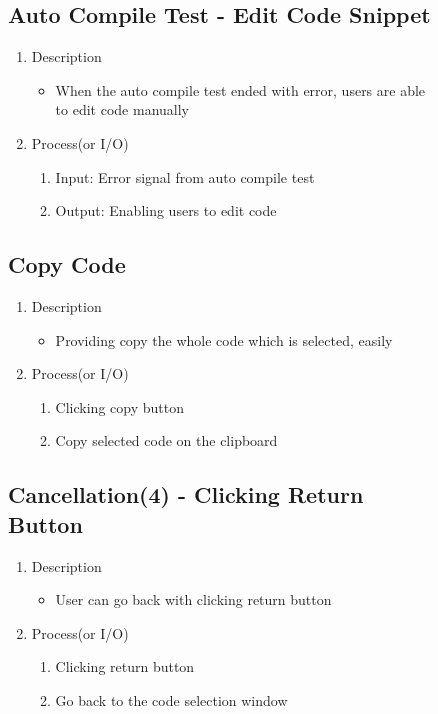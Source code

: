 \documentclass[conference]{IEEEtran}
\begin{document}
\begin{itemize}
\begin{itemize}
\begin{itemize}
\begin{itemize}
\begin{figure}[h]
\begin{enumerate}
\begin{itemize}
\begin{enumerate}
\textit{}

\subsection{Auto Compile Test - Edit Code Snippet}
\begin{enumerate}
  \item Description
  \begin{itemize}
    \item When the auto compile test ended with error, users are able to edit code manually
  \end{itemize}
  \item Process(or I/O)
  \begin{enumerate}
    \item Input: Error signal from auto compile test
    \item Output: Enabling users to edit code
  \end{enumerate}
\end{enumerate}


\subsection{Copy Code}

\begin{enumerate}
  \item Description
  \begin{itemize}
    \item Providing copy the whole code which is selected, easily
  \end{itemize}
  \item Process(or I/O)
  \begin{enumerate}
    \item Clicking copy button
    \item Copy selected code on the clipboard
  \end{enumerate}
\end{enumerate}
\textit{}



\subsection{Cancellation(4) - Clicking Return Button}
\begin{enumerate}
  \item Description
  \begin{itemize}
    \item User can go back with clicking return button
  \end{itemize}
  \item Process(or I/O)
  \begin{enumerate}
    \item Clicking return button
    \item Go back to the code selection window
  \end{enumerate}
\end{enumerate}
\textit{}



\end{enumerate}
\end{itemize}
\end{enumerate}
\end{figure}
\end{itemize}
\end{itemize}
\end{itemize}
\end{itemize}
\end{document}
